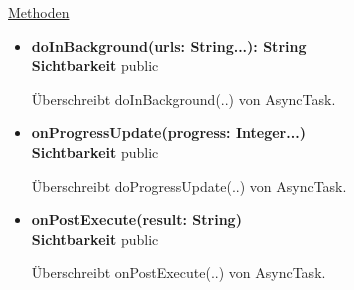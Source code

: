 \underline{Methoden}
\begin{itemize}
\itemsep0pt
\item \textbf{doInBackground(urls: String...): String}\hfill\\
\textbf{Sichtbarkeit} public

Überschreibt doInBackground(..) von AsyncTask.

\item \textbf{onProgressUpdate(progress: Integer...)}\hfill\\
\textbf{Sichtbarkeit} public

Überschreibt doProgressUpdate(..) von AsyncTask.

\item \textbf{onPostExecute(result: String)}\hfill\\
\textbf{Sichtbarkeit} public

Überschreibt onPostExecute(..) von AsyncTask.
\end{itemize}